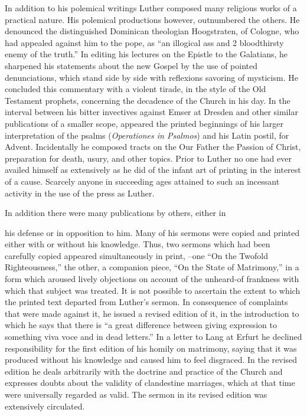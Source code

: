 In addition to his polemical writings Luther composed many religious
works of a practical nature. His polemical productions however, outnumbered
the others. He denounced the distinguished Dominican
theologian Hoogstraten, of Cologne, who had appealed
against him to the pope, as “an illogical ass and 2 bloodthirsty enemy
of the truth.” In editing his lectures on the Epistle to the Galatians,
he sharpened his statements about the new Gospel by the use
of pointed denunciations, which stand side by side with reflexions savoring
of mysticism. He concluded this commentary with a violent tirade,
in the style of the Old Testament prophets, concerning the decadence
of the Church in his day. In the interval between his bitter invectives
against Emser at Dresden and other similar publications of a smaller
scope, appeared the printed beginnings of his larger interpretation
of the psalms (\textit{Operationes in Psalmos}) and his Latin postil, for
Advent. Incidentally he composed tracts on the Our Father the
Passion of Christ, preparation for death, usury, and other topics.
Prior to Luther no one had ever availed himself as extensively as he
did of the infant art of printing in the interest of a cause. Scarcely
anyone in succeeding ages attained to such an incessant activity in
the use of the press as Luther.

In addition there were many publications by others, either in

his defense or in opposition to him. Many of his sermons were copied
and printed either with or without his knowledge. Thus, two sermons
which had been carefully copied appeared simultaneously in print,
--one “On the Twofold Righteousness,” the other, a companion
piece, “On the State of Matrimony,” in a form which aroused lively
objections on account of the unheard-of frankness with which
that subject was treated. It is not possible to ascertain the extent to
which the printed text departed from Luther’s sermon. In consequence of
complaints that were made against it, he issued a revised
edition of it, in the introduction to which he says that there is “a
great difference between giving expression to something viva voce
and in dead letters.” In a letter to Lang at Erfurt he declined responsibility
for the first edition of his homily on matrimony, saying that
it was produced without his knowledge and caused him to feel disgraced.
In the revised edition he deals arbitrarily with the doctrine
and practice of the Church and expresses doubts about the validity
of clandestine marriages, which at that time were universally regarded
as valid. The sermon in its revised edition was extensively
circulated.

